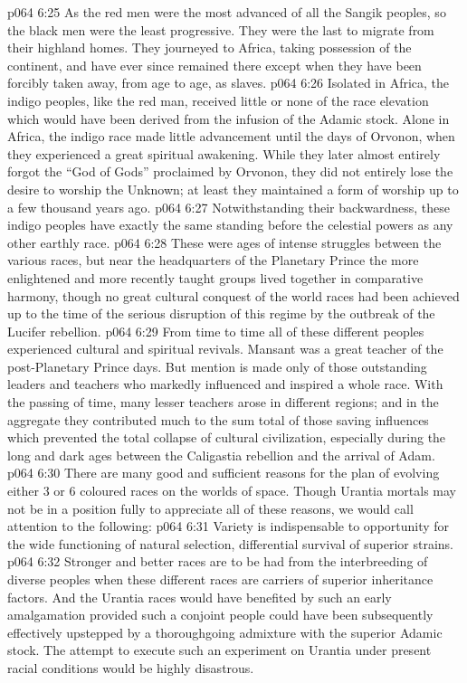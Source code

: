 \vs p064 6:25 \bibnobreakspace {} As the red men were the most advanced of all the Sangik peoples, so the black men were the least progressive. They were the last to migrate from their highland homes. They journeyed to Africa, taking possession of the continent, and have ever since remained there except when they have been forcibly taken away, from age to age, as slaves.
\vs p064 6:26 Isolated in Africa, the indigo peoples, like the red man, received little or none of the race elevation which would have been derived from the infusion of the Adamic stock. Alone in Africa, the indigo race made little advancement until the days of Orvonon, when they experienced a great spiritual awakening. While they later almost entirely forgot the “God of Gods” proclaimed by Orvonon, they did not entirely lose the desire to worship the Unknown; at least they maintained a form of worship up to a few thousand years ago.
\vs p064 6:27 Notwithstanding their backwardness, these indigo peoples have exactly the same standing before the celestial powers as any other earthly race.
\vs p064 6:28 \pc These were ages of intense struggles between the various races, but near the headquarters of the Planetary Prince the more enlightened and more recently taught groups lived together in comparative harmony, though no great cultural conquest of the world races had been achieved up to the time of the serious disruption of this regime by the outbreak of the Lucifer rebellion.
\vs p064 6:29 \pc From time to time all of these different peoples experienced cultural and spiritual revivals. Mansant was a great teacher of the post\hyp{}Planetary Prince days. But mention is made only of those outstanding leaders and teachers who markedly influenced and inspired a whole race. With the passing of time, many lesser teachers arose in different regions; and in the aggregate they contributed much to the sum total of those saving influences which prevented the total collapse of cultural civilization, especially during the long and dark ages between the Caligastia rebellion and the arrival of Adam.
\vs p064 6:30 \pc There are many good and sufficient reasons for the plan of evolving either 3 or 6 coloured races on the worlds of space. Though Urantia mortals may not be in a position fully to appreciate all of these reasons, we would call attention to the following:
\vs p064 6:31 \bibnobreakspace Variety is indispensable to opportunity for the wide functioning of natural selection, differential survival of superior strains.
\vs p064 6:32 \bibnobreakspace Stronger and better races are to be had from the interbreeding of diverse peoples when these different races are carriers of superior inheritance factors. And the Urantia races would have benefited by such an early amalgamation provided such a conjoint people could have been subsequently effectively upstepped by a thoroughgoing admixture with the superior Adamic stock. The attempt to execute such an experiment on Urantia under present racial conditions would be highly disastrous.
